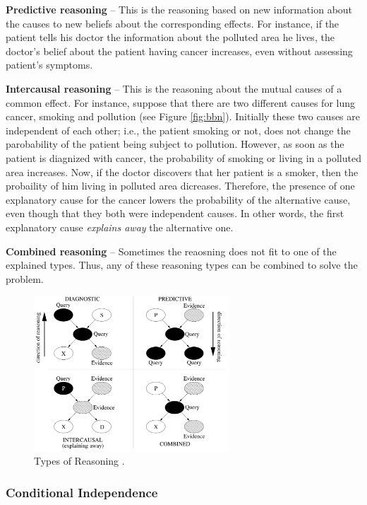 \documentclass[11pt]{article}
\begin{document}
\textbf{Predictive reasoning} -- This is the reasoning based on new information
about the causes to new beliefs about the corresponding effects. For instance,
if the patient tells his doctor the information about the polluted area he
lives, the doctor's belief about the patient having cancer increases, even
without assessing patient's symptoms.

\textbf{Intercausal reasoning} -- This is the reasoning about the mutual causes
of a common effect. For instance,  suppose that there are two different causes
for lung cancer, smoking and pollution (see Figure \ref{fig:bbn}). Initially
these two causes are independent of each other; i.e., the patient smoking or
not, does not change the parobability of the patient being subject to pollution.
However, as soon as the patient is diagnized with cancer, the probability of
smoking or living in a polluted area increases. Now, if the doctor discovers
that her patient is a smoker, then the probaility of him living in polluted area
dicreases. Therefore, the presence of one explanatory cause for the cancer
lowers the probability of the alternative cause, even though that they both were
independent causes. In other words, the first explanatory cause \textit{explains
away} the alternative one.

\textbf{Combined reasoning} -- Sometimes the reaosning does not fit to one of
the explained types. Thus, any of these reasoning types can be combined to solve
the problem.

\begin{figure}[tbh]
  \center
  \includegraphics[width=0.65\textwidth]{figure/reasoning-types.png}
  \caption{Types of Reasoning \cite{korb:bayesian-ai}.}
  \label{fig:reasoning-types}
\end{figure}

\subsubsection{Conditional Independence}
\label{sec:conditional-independence}
\end{document}
